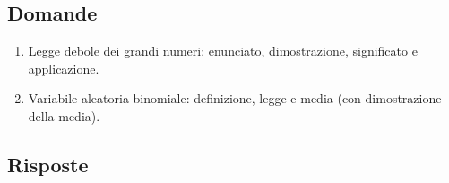 \documentclass{article}
\begin{document}
\section{}%

\subsection*{Domande}

\begin{enumerate}
    \item Legge debole dei grandi numeri: enunciato, dimostrazione, significato e applicazione.
    \item Variabile aleatoria binomiale: definizione, legge e media (con dimostrazione della media).
\end{enumerate}

\subsection*{Risposte}
\end{document}
